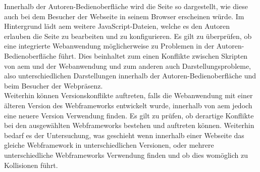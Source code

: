 
Innerhalb der Autoren-Bedienoberfläche wird die Seite so dargestellt, wie diese auch bei dem Besucher der Webseite in seinem Browser erscheinen würde. Im Hintergrund lädt \ac{aem} weitere JavaScript-Dateien, welche es den Autoren erlauben die Seite zu bearbeiten und zu konfigurieren. Es gilt zu überprüfen, ob eine integrierte Webanwendung möglicherweise zu Problemen in der Autoren-Bedienoberfläche führt. Dies beinhaltet zum einen Konflikte zwischen Skripten von \ac{aem} und der Webanwendung und zum anderen auch Darstellungsprobleme, also unterschiedlichen Darstellungen innerhalb der Autoren-Bedienoberfläche und beim Besucher der Webpräsenz. \\
Weiterhin können Versionskonflikte auftreten, falls die Webanwendung mit einer älteren Version des Webframeworks entwickelt wurde, innerhalb von \ac{aem} jedoch eine neuere Version Verwendung finden. Es gilt zu prüfen, ob derartige Konflikte bei den ausgewählten Webframeworks bestehen und auftreten können. Weiterhin bedarf es der Untersuchung, was geschieht wenn innerhalb einer Webseite das gleiche Webframework in unterschiedlichen Versionen, oder mehrere unterschiedliche Webframeworks Verwendung finden und ob dies womöglich zu Kollisionen führt.